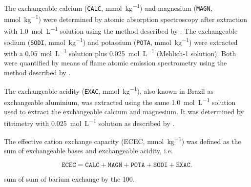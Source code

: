 {The exchangeable calcium (\texttt{CALC}, \si{\milli\mole\per\kilo\gram}) and magnesium (\texttt{MAGN}, 
\si{\milli\mole\per\kilo\gram}) were determined by atomic absorption spectroscopy after extraction with 
\SI{1.0}{\mole\per\liter}  solution using the method described by . 
The exchangeable sodium (\texttt{SODI}, \si{\milli\mole\per\kilo\gram}) and potassium (\texttt{POTA}, 
\si{\milli\mole\per\kilo\gram}) were extracted with a \SI{0.05}{\mole\per\liter}  solution plus 
\SI{0.025}{\mole\per\liter}  (Mehlich-\num{1} solution). Both were quantified by means of flame 
atomic emission spectrometry using the method described by .

The exchangeable acidity (\texttt{EXAC}, \si{\milli\mole\per\kilo\gram}), also known in Brazil as exchangeable 
aluminium, was extracted using the same \SI{1.0}{\mole\per\liter}  solution used to extract the 
exchangeable calcium and magnesium. It was determined by titrimetry with \SI{0.025}{\mole\per\liter} 
 solution as described by .


The effective cation exchange capacity (ECEC, \si{\milli\mole\per\kilo\gram}) was defined as the sum of 
exchangeable bases and exchangeable acidity, i.e. 

\begin{equation*}
 \texttt{ECEC} = \texttt{CALC} + \texttt{MAGN} + \texttt{POTA} + \texttt{SODI} + \texttt{EXAC}.
\end{equation*}


sum of 
sum of 
barium 
exchange 
by the 
100. 

}
